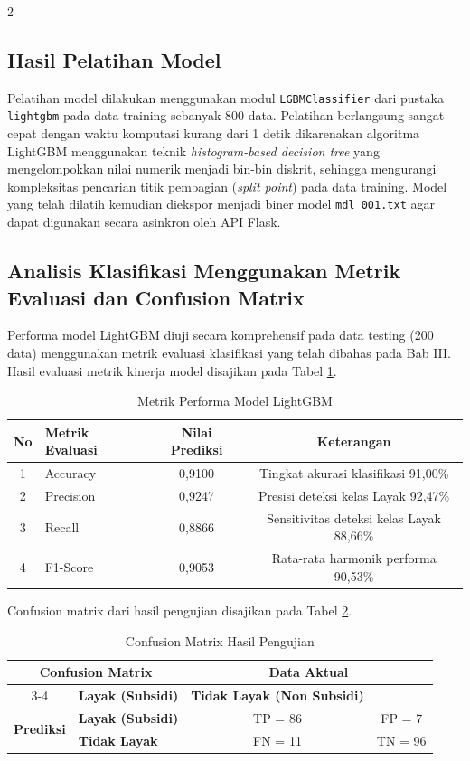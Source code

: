 \documentclass[12pt, a4paper, onecolumn, oneside]{report}
\begin{document}
\begin{spacing}{2}
\subsection{Hasil Pelatihan Model}
Pelatihan model dilakukan menggunakan modul \texttt{LGBMClassifier} dari pustaka \texttt{lightgbm} pada data training sebanyak 800 data. Pelatihan berlangsung sangat cepat dengan waktu komputasi kurang dari 1 detik dikarenakan algoritma LightGBM menggunakan teknik \textit{histogram-based decision tree} yang mengelompokkan nilai numerik menjadi bin-bin diskrit, sehingga mengurangi kompleksitas pencarian titik pembagian (\textit{split point}) pada data training. Model yang telah dilatih kemudian diekspor menjadi biner model \texttt{mdl\_001.txt} agar dapat digunakan secara asinkron oleh API Flask.

\subsection{Analisis Klasifikasi Menggunakan Metrik Evaluasi dan Confusion Matrix}
Performa model LightGBM diuji secara komprehensif pada data testing (200 data) menggunakan metrik evaluasi klasifikasi yang telah dibahas pada Bab III.
Hasil evaluasi metrik kinerja model disajikan pada Tabel \ref{tab:evaluasi_metrik}.

\begin{table}[H]
\centering
\caption{Metrik Performa Model LightGBM}
\label{tab:evaluasi_metrik}
\begin{tabular}{|c|l|c|c|}
\hline
\textbf{No} & \textbf{Metrik Evaluasi} & \textbf{Nilai Prediksi} & \textbf{Keterangan} \\ \hline
1 & Accuracy & 0,9100 & Tingkat akurasi klasifikasi 91,00\% \\ \hline
2 & Precision & 0,9247 & Presisi deteksi kelas Layak 92,47\% \\ \hline
3 & Recall & 0,8866 & Sensitivitas deteksi kelas Layak 88,66\% \\ \hline
4 & F1-Score & 0,9053 & Rata-rata harmonik performa 90,53\% \\ \hline
\end{tabular}
\end{table}

Confusion matrix dari hasil pengujian disajikan pada Tabel \ref{tab:confusion_matrix_actual}.

\begin{table}[H]
\centering
\caption{Confusion Matrix Hasil Pengujian}
\label{tab:confusion_matrix_actual}
\begin{tabular}{|c|l|c|c|}
\hline
\multicolumn{2}{|c|}{\multirow{2}{*}{Confusion Matrix}} & \multicolumn{2}{c|}{\textbf{Data Aktual}} \\ \cline{3-4}
\multicolumn{2}{|c|}{} & \textbf{Layak (Subsidi)} & \textbf{Tidak Layak (Non Subsidi)} \\ \hline
\multirow{2}{*}{\textbf{Prediksi}} & \textbf{Layak (Subsidi)} & TP = 86 & FP = 7 \\ \cline{2-4}
 & \textbf{Tidak Layak} & FN = 11 & TN = 96 \\ \hline
\end{tabular}
\end{table}


\end{spacing}
\end{document}
